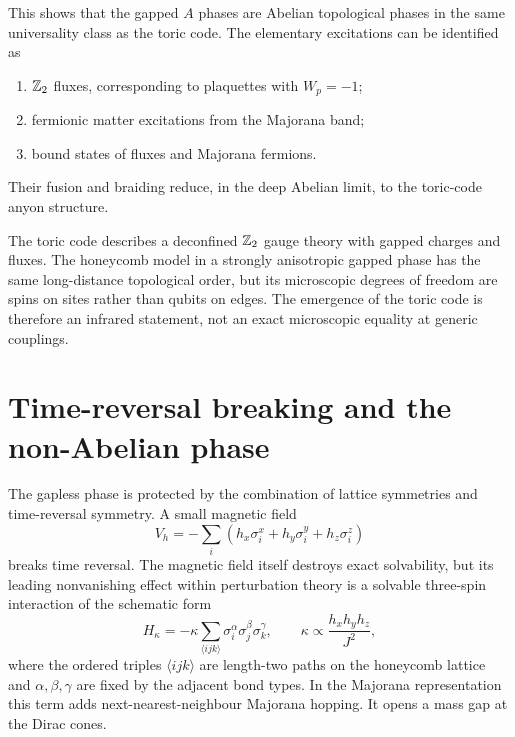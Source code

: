This shows that the gapped \(A\) phases are Abelian topological phases in the
same universality class as the toric code.  The elementary excitations can be
identified as
\begin{enumerate}[label=(\roman*)]
    \item \(\mathbb{Z}_2\) fluxes, corresponding to plaquettes with \(W_p=-1\);
    \item fermionic matter excitations from the Majorana band;
    \item bound states of fluxes and Majorana fermions.
\end{enumerate}
Their fusion and braiding reduce, in the deep Abelian limit, to the toric-code
anyon structure.

\begin{remark}
The toric code describes a deconfined \(\mathbb{Z}_2\) gauge theory with gapped charges
and fluxes.  The honeycomb model in a strongly anisotropic gapped phase has the
same long-distance topological order, but its microscopic degrees of freedom are
spins on sites rather than qubits on edges.  The emergence of the toric code is
therefore an infrared statement, not an exact microscopic equality at generic
couplings.
\end{remark}

\section{Time-reversal breaking and the non-Abelian phase}
\label{sec:kitaev-non-abelian-phase}

The gapless phase is protected by the combination of lattice symmetries and
time-reversal symmetry.  A small magnetic field
\begin{equation}
\label{eq:kitaev-magnetic-field-perturbation}
    V_h=-\sum_i\left(h_x\sigma_i^x+h_y\sigma_i^y+h_z\sigma_i^z\right)
\end{equation}
breaks time reversal.  The magnetic field itself destroys exact solvability, but
its leading nonvanishing effect within perturbation theory is a solvable
three-spin interaction of the schematic form
\begin{equation}
\label{eq:kitaev-effective-three-spin-term}
    H_\kappa
    =
    -\kappa\sum_{\langle i j k\rangle}
    \sigma_i^\alpha\sigma_j^\beta\sigma_k^\gamma,
    \qquad
    \kappa\propto \frac{h_xh_yh_z}{J^2},
\end{equation}
where the ordered triples \(\langle i j k\rangle\) are length-two paths on the
honeycomb lattice and \(\alpha,\beta,\gamma\) are fixed by the adjacent bond
types.  In the Majorana representation this term adds next-nearest-neighbour
Majorana hopping.  It opens a mass gap at the Dirac cones.

